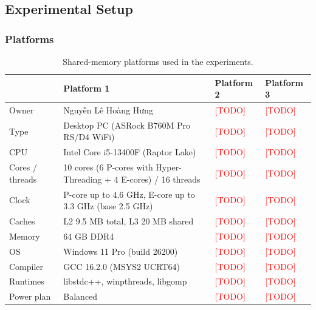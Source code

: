 \subsection{Experimental Setup}
\label{sec:ex2-setup}

\subsubsection{Platforms}

\begin{table}[H]
\centering
\caption{Shared-memory platforms used in the experiments.}
\label{tab:ex2-platforms}
\small
\begin{tabular}{p{2.3cm} p{4.7cm} p{3.4cm} p{3.4cm}}
\toprule
 & \textbf{Platform 1} & \textbf{Platform 2} & \textbf{Platform 3} \\
\midrule
Owner        & Nguyễn Lê Hoàng Hưng & \textcolor{red}{[TODO]} & \textcolor{red}{[TODO]} \\
Type         & Desktop PC (ASRock B760M Pro RS/D4 WiFi) & \textcolor{red}{[TODO]} & \textcolor{red}{[TODO]} \\
CPU          & Intel Core i5-13400F (Raptor Lake) & \textcolor{red}{[TODO]} & \textcolor{red}{[TODO]} \\
Cores / threads & 10 cores (6 P-cores with Hyper-Threading + 4 E-cores) / 16 threads & \textcolor{red}{[TODO]} & \textcolor{red}{[TODO]} \\
Clock        & P-core up to 4.6 GHz, E-core up to 3.3 GHz (base 2.5 GHz) & \textcolor{red}{[TODO]} & \textcolor{red}{[TODO]} \\
Caches       & L2 9.5 MB total, L3 20 MB shared & \textcolor{red}{[TODO]} & \textcolor{red}{[TODO]} \\
Memory       & 64 GB DDR4 & \textcolor{red}{[TODO]} & \textcolor{red}{[TODO]} \\
OS           & Windows 11 Pro (build 26200) & \textcolor{red}{[TODO]} & \textcolor{red}{[TODO]} \\
Compiler     & GCC 16.2.0 (MSYS2 UCRT64) & \textcolor{red}{[TODO]} & \textcolor{red}{[TODO]} \\
Runtimes     & libstdc++, winpthreads, libgomp & \textcolor{red}{[TODO]} & \textcolor{red}{[TODO]} \\
Power plan   & Balanced & \textcolor{red}{[TODO]} & \textcolor{red}{[TODO]} \\
\bottomrule
\end{tabular}
\end{table}


